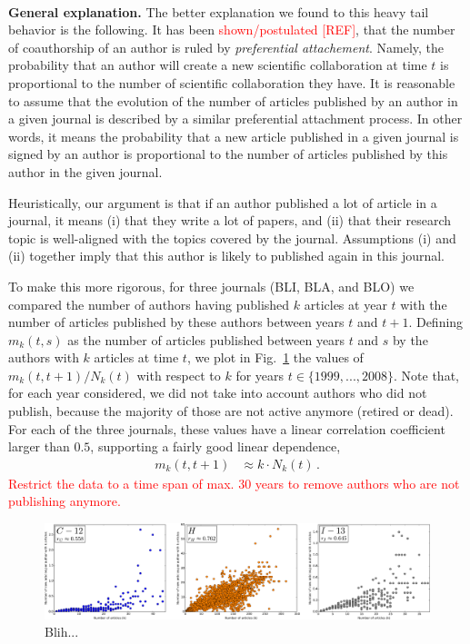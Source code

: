 \documentclass[aps,prl,floatfix,twocolumn]{revtex4-1}
\begin{document}
\paragraph{}
{\bf General explanation. }
The better explanation we found to this heavy tail behavior is the following. 
It has been \textcolor{red}{shown/postulated [REF]}, that the number of coauthorship of an author is ruled by \emph{preferential attachement}. 
Namely, the probability that an author will create a new scientific collaboration at time $t$ is proportional to the number of scientific collaboration they have. 
It is reasonable to assume that the evolution of the number of articles published by an author in a given journal is described by a similar preferential attachment process. 
In other words, it means the probability that a new article published in a given journal 
is signed by an author is proportional to the number of articles published by this author in the given journal. 

Heuristically, our argument is that if an author published a lot of article in a journal, it means (i) that they write a lot of papers, 
and (ii) that their research topic is well-aligned with the topics covered by the journal. 
Assumptions (i) and (ii) together imply that this author is likely to published again in this journal. 

To make this more rigorous, for three journals (BLI, BLA, and BLO) we compared the number of authors having published $k$ articles at year $t$ 
with the number of articles published by these authors between years $t$ and $t+1$. 
Defining $m_k(t,s)$ as the number of articles published between years $t$ and $s$ by the authors with $k$ articles at time $t$, we plot in Fig.~\ref{fig:2} the values of $m_k(t,t+1)/N_k(t)$ with respect to $k$ for years $t\in\{1999,...,2008\}$. 
Note that, for each year considered, we did not take into account authors who did not publish, because the majority of those are not active anymore (retired or dead). 
For each of the three journals, these values have a linear correlation coefficient larger than $0.5$, supporting a fairly good linear dependence, 
\begin{align}\label{eq:prop}
 m_k(t,t+1) &\approx k\cdot N_k(t)\, . 
\end{align}
\textcolor{red}{Restrict the data to a time span of max. 30 years to remove authors who are not publishing anymore.}

\begin{figure}
 \centering
 \includegraphics[width=\textwidth]{../figures/CHI_correl.pdf}
 \caption{Blih...}
 \label{fig:2}
\end{figure}
\end{document}
